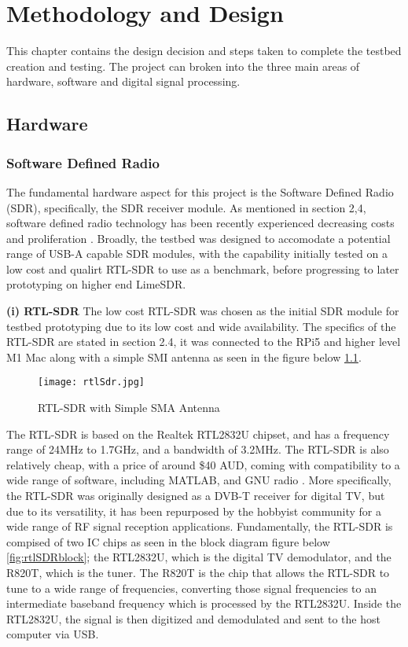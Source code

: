 \chapter{Methodology and Design \label{sec:methodology}}

This chapter contains the design decision and steps taken to complete the testbed creation and testing. The project can broken into the three main areas of hardware, software and digital signal processing. 

\section{Hardware \label{sec:hardware}}

\subsection{Software Defined Radio \label{sec: SDRdongleHardware}}
The fundamental hardware aspect for this project is the Software Defined Radio (SDR), specifically, the SDR receiver module. As mentioned in section 2,4, software defined radio technology has been recently experienced decreasing costs and proliferation \cite{SDRtheory}. Broadly, the testbed was designed to accomodate a potential range of USB-A capable SDR modules, with the capability initially tested on a low cost and qualirt RTL-SDR to use as a benchmark, before progressing to later prototyping on higher end LimeSDR.

\vspace{0.5cm} \noindent 
\textbf{(i) RTL-SDR}
The low cost RTL-SDR was chosen as the initial SDR module for testbed prototyping  due to its low cost and wide availability. The specifics of the RTL-SDR are stated in section 2.4, it was connected to the RPi5 and higher level M1 Mac along with a simple SMI antenna as seen in the figure below \ref*{fig:rtlSDR}. 

\begin{figure}[htbp]
    \centering
    \texttt{[image: rtlSdr.jpg]}
    \caption{RTL-SDR with Simple SMA Antenna}
    \label{fig:rtlSDR}
\end{figure}

The RTL-SDR is based on the Realtek RTL2832U chipset, and has a frequency range of 24MHz to 1.7GHz, and a bandwidth of 3.2MHz. The RTL-SDR is also relatively cheap, with a price of around \$40 AUD, coming with compatibility to a wide range of software, including MATLAB, and GNU radio \cite{SDRdongle}. More specifically, the RTL-SDR was originally designed as a DVB-T receiver for digital TV, but due to its versatility, it has been repurposed by the hobbyist community for a wide range of RF signal reception applications. Fundamentally, the RTL-SDR is compised of two IC chips as seen in the block diagram figure below \ref*{fig:rtlSDRblock}; the RTL2832U, which is the digital TV demodulator, and the R820T, which is the tuner. The R820T is the chip that allows the RTL-SDR to tune to a wide range of frequencies, converting those signal frequencies to an intermediate baseband frequency which is processed by the RTL2832U. Inside the RTL2832U, the signal is then digitized and demodulated and sent to the host computer via USB.

